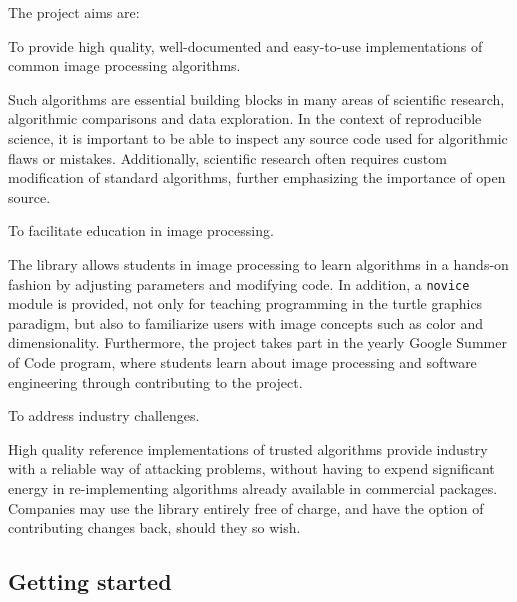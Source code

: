 \documentclass[letterpaper,compsoc,twoside]{IEEEtran}
\begin{document}
The project aims are:
\begin{list}{.}
{
\setlength{\rightmargin}{\leftmargin}
}

\item 

To provide high quality, well-documented and easy-to-use
implementations of common image processing algorithms.

Such algorithms are essential building blocks in many areas of scientific
research, algorithmic comparisons and data exploration. In the
context of reproducible science, it is important to be able to inspect any
source code used for algorithmic flaws or mistakes. Additionally, scientific
research often requires custom modification of standard algorithms, further
emphasizing the importance of open source.
\item 

To facilitate education in image processing.

The library allows students in image processing to learn algorithms in a
hands-on fashion by adjusting parameters and modifying code. In addition, a
\texttt{novice} module is provided, not only for teaching programming in the
\textquotedbl{}turtle graphics\textquotedbl{} paradigm, but also to familiarize users with image
concepts such as color and dimensionality. Furthermore, the project
takes part in the yearly Google Summer of Code \cite{gsoc} program, where
students learn about image processing and software engineering through
contributing to the project.
\item 

To address industry challenges.

High quality reference implementations of trusted algorithms provide
industry with a reliable way of attacking problems, without having to expend
significant energy in re-implementing algorithms already available in
commercial packages.  Companies may use the library entirely free of charge,
and have the option of contributing changes back, should they so wish.\end{list}


\subsection{Getting started%
  \label{getting-started}%
}
\end{document}

